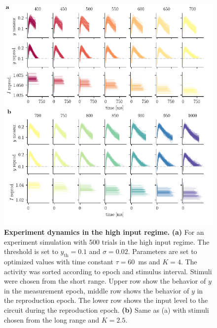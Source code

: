 \documentclass[10pt]{article}
\begin{document}
\begin{figure}[!htb]
	\centering
	\includegraphics{figures/supp_experiment_high.pdf}
	\caption{\textbf{Experiment dynamics in the high input regime.} 
	\textbf{(a)} For an experiment simulation with 500 trials in the high input regime. The threshold is set to $y_{\text{th}}=0.1$ and $\sigma=0.02$. Parameters are set to optimized values with time constant $\tau = 60$~ms and $K = 4$. The activity was sorted according to epoch and stimulus interval. Stimuli were chosen from the short range. Upper row show the behavior of $y$ in the measurement epoch, middle row shows the behavior of $y$ in the reproduction epoch. The lower row shows the input level to the circuit during the reproduction epoch. 
	\textbf{(b)} Same as (a) with stimuli chosen from the long range and $K = 2.5$.
	}
\label{sup:experiment_high}
\end{figure}
\end{document}
